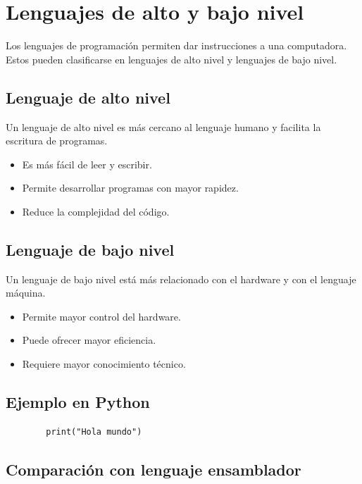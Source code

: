 \documentclass[12pt,a4paper]{article}
\begin{document}
	\section{Lenguajes de alto y bajo nivel}
	
	Los lenguajes de programación permiten dar instrucciones a una computadora. Estos pueden clasificarse en lenguajes de alto nivel y lenguajes de bajo nivel.
	
	\subsection{Lenguaje de alto nivel}
	
	Un lenguaje de alto nivel es más cercano al lenguaje humano y facilita la escritura de programas.
	
	\begin{itemize}
		\item Es más fácil de leer y escribir.
		\item Permite desarrollar programas con mayor rapidez.
		\item Reduce la complejidad del código.
	\end{itemize}
	
	\subsection{Lenguaje de bajo nivel}
	
	Un lenguaje de bajo nivel está más relacionado con el hardware y con el lenguaje máquina.
	
	\begin{itemize}
		\item Permite mayor control del hardware.
		\item Puede ofrecer mayor eficiencia.
		\item Requiere mayor conocimiento técnico.
	\end{itemize}
	
	\subsection{Ejemplo en Python}
	
	\begin{verbatim}
		print("Hola mundo")
	\end{verbatim}
	
	\subsection{Comparación con lenguaje ensamblador}
	
\end{document}

